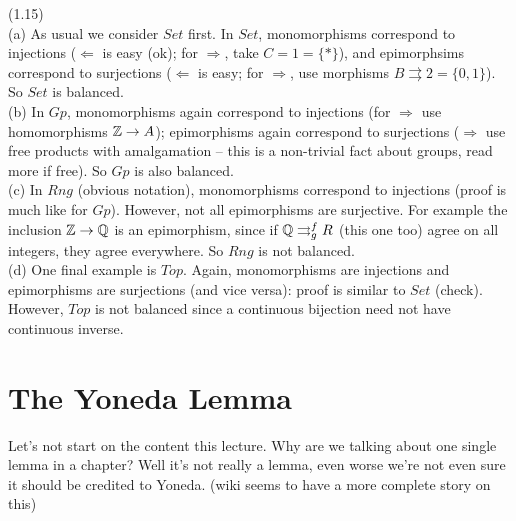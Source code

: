 \documentclass[a4paper]{article}
\begin{document}
\begin{eg} (1.15)\\
    (a) As usual we consider $Set$ first. In $Set$, monomorphisms correspond to injections ($\Leftarrow$ is easy (ok); for $\Rightarrow$, take $C = 1 = \{*\}$), and epimorphsims correspond to surjections ($\Leftarrow$ is easy; for $\Rightarrow$, use morphisms $B \rightrightarrows 2 = \{0,1\}$). So $Set$ is balanced.\\
    (b) In $Gp$, monomorphisms again correspond to injections (for $\Rightarrow$ use homomorphisms $\mathbb{Z} \to A$); epimorphisms again correspond to surjections ($\Rightarrow$ use free products with amalgamation -- this is a non-trivial fact about groups, read more if free). So $Gp$ is also balanced.\\
    (c) In $Rng$ (obvious notation), monomorphisms correspond to injections (proof is much like for $Gp$). However, not all epimorphisms are surjective. For example the inclusion $\mathbb{Z} \to \mathbb{Q}$ is an epimorphism, since if $\mathbb{Q} \rightrightarrows^f_g R$ (this one too) agree on all integers, they agree everywhere. So $Rng$ is not balanced.\\
    (d) One final example is $Top$. Again, monomorphisms are injections and epimorphisms are surjections (and vice versa): proof is similar to $Set$ (check). However, $Top$ is not balanced since a continuous bijection need not have continuous inverse.
\end{eg}

\newpage

\section{The Yoneda Lemma}
Let's not start on the content this lecture. Why are we talking about one single lemma in a chapter? Well it's not really a lemma, even worse we're not even sure it should be credited to Yoneda. (wiki seems to have a more complete story on this)
\end{document}
